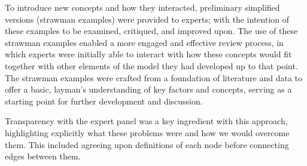 To introduce new concepts and how they interacted, preliminary simplified versions (strawman examples) were provided to experts; with the intention of these examples to be examined, critiqued, and improved upon. The use of these strawman examples enabled a more engaged and effective review process, in which experts were initially able to interact with how these concepts would fit together with other elements of the model they had developed up to that point. The strawman examples were crafted from a foundation of literature and data to offer a basic, layman's understanding of key factors and concepts, serving as a starting point for further development and discussion. 




Transparency with the expert panel was a key ingredient with this approach, highlighting explicitly what these problems were and how we would overcome them. This included agreeing upon definitions of each node before connecting edges between them.

